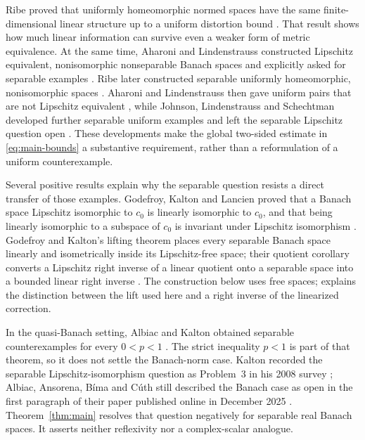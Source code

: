 Ribe proved that uniformly homeomorphic normed spaces have the same
finite-dimensional linear structure up to a uniform distortion bound
\cite[Theorem~1]{Ribe76}. That result shows how much linear information
can survive even a weaker form of metric equivalence. At the same time,
Aharoni and Lindenstrauss constructed Lipschitz equivalent,
nonisomorphic nonseparable Banach spaces and explicitly asked for
separable examples \cite[pp.~281--282]{AL78}. Ribe later constructed
separable uniformly homeomorphic, nonisomorphic spaces \cite{Ribe84}.
Aharoni and Lindenstrauss then gave uniform pairs that are not
Lipschitz equivalent \cite{AL85}, while Johnson, Lindenstrauss and
Schechtman developed further separable uniform examples and left the
separable Lipschitz question open
\cite[Theorem~5.8 and Section~8(3)]{JLS96}. These developments make the
global two-sided estimate in \eqref{eq:main-bounds} a substantive
requirement, rather than a reformulation of a uniform counterexample.

Several positive results explain why the separable question resists a
direct transfer of those examples. Godefroy, Kalton and Lancien proved
that a Banach space Lipschitz isomorphic to \(c_0\) is linearly
isomorphic to \(c_0\), and that being linearly isomorphic to a subspace
of \(c_0\) is invariant under Lipschitz isomorphism
\cite[Theorems~2.1--2.2]{GKL00}. Godefroy and Kalton's lifting theorem
places every separable Banach space linearly and isometrically inside
its Lipschitz-free space; their quotient corollary converts a
Lipschitz right inverse of a linear quotient onto a separable space
into a bounded linear right inverse
\cite[Theorem~3.1 and Corollary~3.2]{GK03}. The construction below uses
free spaces;  explains the distinction between
the lift used here and a right inverse of the linearized correction.

In the quasi-Banach setting, Albiac and Kalton obtained separable
counterexamples for every \(0<p<1\) \cite[Theorem~5.4]{AK09}.
The strict inequality \(p<1\) is part of that theorem, so it does not
settle the Banach-norm case. Kalton recorded the separable
Lipschitz-isomorphism question as Problem~3 in his 2008 survey
\cite[Section~2.2]{Kalton08}; Albiac, Ansorena, B\'{i}ma and C\'{u}th
still described the Banach case as open in the first paragraph of
their paper published online in December 2025 \cite{AABC26}.
Theorem~\ref{thm:main} resolves that question negatively for separable
real Banach spaces. It asserts neither reflexivity nor a complex-scalar
analogue.

